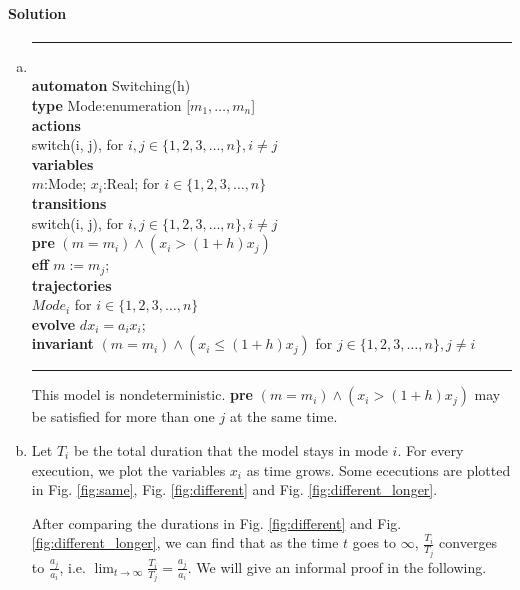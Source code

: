 \documentclass[11pt]{article}
\newcommand{\tab}{\hspace*{5mm}}
\begin{document}
\paragraph{Solution}
\begin{enumerate}[(a)]
\item
\noindent\rule{7cm}{1.0pt}\\
\textbf{automaton} Switching(h)\\
\tab\textbf{type} Mode:enumeration [$m_1, \ldots, m_n$]\\
\tab\textbf{actions}\\
\tab\tab switch(i, j), for $i,j \in \{1,2,3,\ldots,n\}, i \neq j$\\
\tab\textbf{variables}\\
\tab\tab $m$:Mode; $x_i$:Real; for $i \in \{1,2,3,\ldots,n\}$\\
\tab\textbf{transitions}\\
\tab\tab switch(i, j), for $i,j \in \{1,2,3,\ldots,n\}, i \neq j$\\
\tab\tab \textbf{pre} $(m = m_i) \wedge (x_i > (1+h)x_j)$\\
\tab\tab \textbf{eff} $m := m_j$;\\
\tab\textbf{trajectories}\\
\tab\tab $Mode_i$ for $i \in \{1,2,3,\ldots,n\}$\\
\tab\tab \textbf{evolve} $dx_i = a_i x_i$;\\
\tab\tab \textbf{invariant} $(m = m_i) \wedge (x_i \leq (1+h)x_j)$ for $j \in \{1,2,3,\ldots,n\}, j \neq i$\\

\noindent\rule{7cm}{1.0pt}

This model is nondeterministic. \textbf{pre} $(m = m_i) \wedge (x_i > (1+h)x_j)$ may be satisfied for more than one $j$ at the same time.

\item
Let $T_i$ be the total duration that the model stays in mode $i$. For every execution, we plot the variables $x_i$ as time grows. Some ececutions are plotted in Fig. \ref{fig:same}, Fig. \ref{fig:different} and Fig. \ref{fig:different_longer}.

After comparing the durations in Fig. \ref{fig:different} and Fig. \ref{fig:different_longer}, we can find that as the time $t$ goes to $\infty$, $\frac{T_i}{T_j}$ converges to $\frac{a_j}{a_i}$, i.e. $\lim_{t \to \infty} \frac{T_i}{T_j} = \frac{a_j}{a_i}$. We will give an informal proof in the following.


\end{enumerate}
\end{document}
